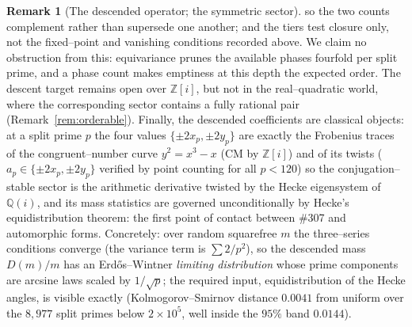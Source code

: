 \documentclass[11pt]{article}
\theoremstyle{definition}
\newtheorem{remark}[theorem]{Remark}
\begin{document}
\begin{remark}[The descended operator; the symmetric sector]
so the two counts complement rather than supersede one another; and the tiers test closure only, not
the fixed--point and vanishing conditions recorded above. We claim no
obstruction from this: equivariance prunes the available phases fourfold per split prime, and a phase
count makes emptiness at this depth the expected order. The descent target remains open over
$\mathbb{Z}[i]$, but not in the real--quadratic world, where the corresponding sector contains a fully
rational pair (Remark~\ref{rem:orderable}). Finally, the
descended coefficients are classical objects: at a split prime $p$ the four values
$\{\pm2x_p,\pm2y_p\}$ are exactly the Frobenius traces of the congruent--number curve $y^2=x^3-x$
(CM by $\mathbb{Z}[i]$) and of its twists ($a_p\in\{\pm2x_p,\pm2y_p\}$ verified by point counting
for all $p<120$) so the conjugation--stable sector is the arithmetic derivative twisted by the
Hecke eigensystem of $\mathbb{Q}(i)$, and its mass statistics are governed unconditionally by Hecke's
equidistribution theorem: the first point of contact between \#307 and automorphic forms. Concretely:
over random squarefree $m$ the three--series conditions converge (the variance term is $\sum 2/p^2$), so
the descended mass $D(m)/m$ has an Erd\H{o}s--Wintner \emph{limiting distribution} whose prime components
are arcsine laws scaled by $1/\sqrt p$; the required input, equidistribution of the Hecke angles, is
visible exactly (Kolmogorov--Smirnov distance $0.0041$ from uniform over the $8{,}977$ split primes below
$2\times10^5$, well inside the $95\%$ band $0.0144$).
\end{remark}
\end{document}
